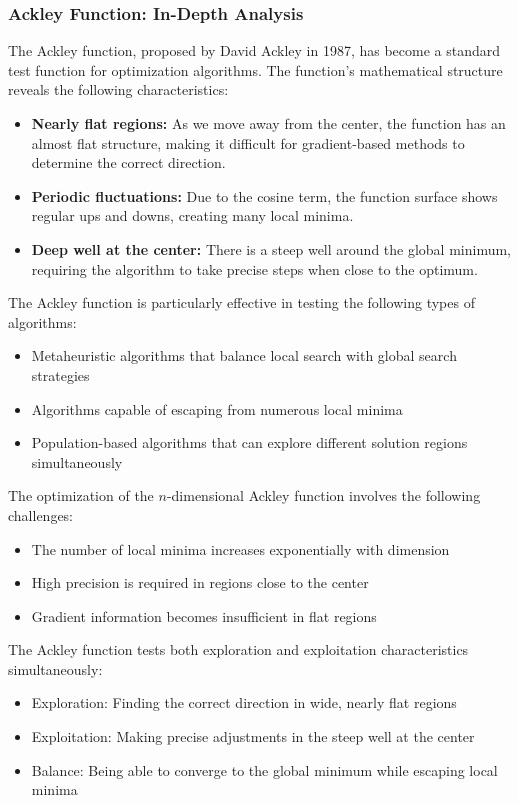 \subsubsection{Ackley Function: In-Depth Analysis}

The Ackley function, proposed by David Ackley in 1987, has become a standard test function for optimization algorithms. The function's mathematical structure reveals the following characteristics:

\begin{itemize}
    \item \textbf{Nearly flat regions:} As we move away from the center, the function has an almost flat structure, making it difficult for gradient-based methods to determine the correct direction.
    
    \item \textbf{Periodic fluctuations:} Due to the cosine term, the function surface shows regular ups and downs, creating many local minima.
    
    \item \textbf{Deep well at the center:} There is a steep well around the global minimum, requiring the algorithm to take precise steps when close to the optimum.
\end{itemize}

The Ackley function is particularly effective in testing the following types of algorithms:

\begin{itemize}
    \item Metaheuristic algorithms that balance local search with global search strategies
    \item Algorithms capable of escaping from numerous local minima
    \item Population-based algorithms that can explore different solution regions simultaneously
\end{itemize}

The optimization of the $n$-dimensional Ackley function involves the following challenges:
\begin{itemize}
    \item The number of local minima increases exponentially with dimension
    \item High precision is required in regions close to the center
    \item Gradient information becomes insufficient in flat regions
\end{itemize}

\begin{tcolorbox}[title=Ackley Function Optimization Challenge]
The Ackley function tests both exploration and exploitation characteristics simultaneously:
\begin{itemize}
    \item Exploration: Finding the correct direction in wide, nearly flat regions
    \item Exploitation: Making precise adjustments in the steep well at the center
    \item Balance: Being able to converge to the global minimum while escaping local minima
\end{itemize}
\end{tcolorbox}

